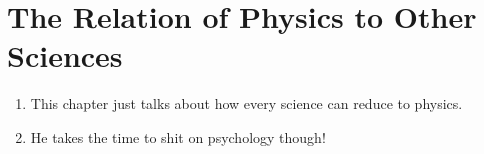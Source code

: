 \section{The Relation of Physics to Other Sciences}

\begin{enumerate}
  \item This chapter just talks about how every science can reduce to
  physics.

  \item He takes the time to shit on psychology though!
\end{enumerate}
